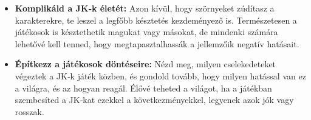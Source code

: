 \begin{itemize}
    \item \textbf{Komplikáld a JK‑k életét:} Azon kívül, hogy szörnyeket zúdítasz a karakterekre, te leszel a legfőbb késztetés kezdeményező is. Természetesen a játékosok is késztethetik magukat vagy másokat, de mindenki számára lehetővé kell tenned, hogy megtapasztalhassák a jellemzőik negatív hatásait.
    \item \textbf{Építkezz a játékosok döntéseire:} Nézd meg, milyen cselekedeteket végeztek a JK‑k játék közben, és gondold tovább, hogy milyen hatással van ez a világra, és az hogyan reagál. Élővé teheted a világot, ha a játékban szembesíted a JK‑kat ezekkel a következményekkel, legyenek azok jók vagy rosszak.
\end{itemize}
